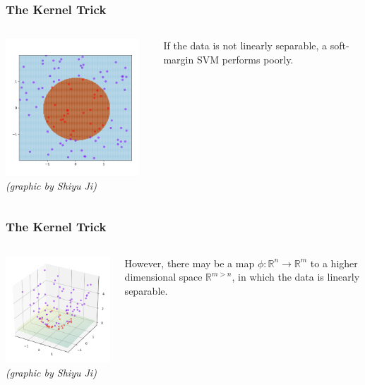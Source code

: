\documentclass[mathserif,serif]{beamer}
\begin{document}
\begin{frame}
  \frametitle{The Kernel Trick}
  \begin{columns}
    \centering
    \includegraphics[width=5cm]{not_linear}
    \textit{\tiny(graphic by Shiyu Ji)}

    If the data is not linearly separable, a soft-margin SVM performs poorly.
  \end{columns}
\end{frame}

\begin{frame}
  \frametitle{The Kernel Trick}
  \begin{columns}
    \centering
    \includegraphics[width=5cm]{kernel_trick}
    \textit{\tiny(graphic by Shiyu Ji)}

    However, there may be a map $\phi: \mathbb{R}^n \to \mathbb{R}^m$ to a higher dimensional space
    $\mathbb{R}^{m>n}$, in which the data is linearly separable.
  \end{columns}
\end{frame}
\end{document}
